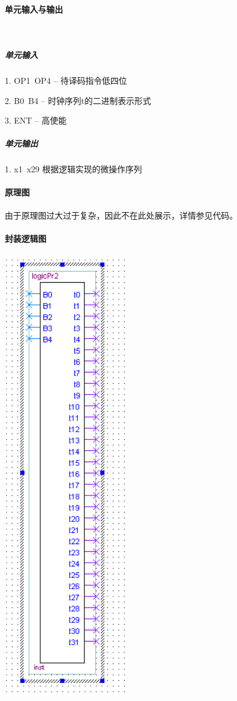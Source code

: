 \documentclass[UTF8]{ctexart}
\begin{document}
    \paragraph{单元输入与输出}

    ~

    \subparagraph{单元输入}

    1. OP1~OP4 -- 待译码指令低四位

    2. B0~B4 -- 时钟序列t的二进制表示形式

    3. ENT -- 高使能

    \subparagraph{单元输出}

    1. x1~x29   根据逻辑实现的微操作序列

    \paragraph{原理图}

    由于原理图过大过于复杂，因此不在此处展示，详情参见代码。

    \paragraph{封装逻辑图}

    \includegraphics[width=0.4\textwidth]{./img/指令译码电路封装逻辑图1.png}
\end{document}
